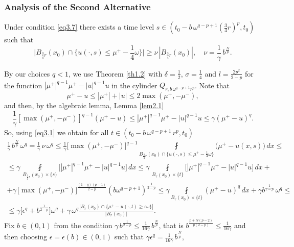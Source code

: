 \documentclass[a4paper,11pt,fullpage]{article}
\numberwithin{equation}{section}
\begin{document}
\subsubsection{Analysis of the Second Alternative}
Under condition \eqref{eq3.7} there exists a time level $s\in (t_0-b\,\omega^{q-p+1}(\frac{3}{4}r)^p, t_0)$ such that
\begin{equation*}
\big|B_{\frac{3}{4} r}(x_0)\cap \big\{u(\cdot, s)\leqslant \mu^+-\frac{1}{4}\omega\big\}\big|\geqslant \nu\,|B_{\frac{3}{4}r}(x_0)|,\quad \nu=\frac{1}{\gamma}\,b^{\frac{N}{p}}.
\end{equation*}

By our choices $q<1$, we use Theorem \ref{th1.2} with  $\delta=\frac{1}{2}$, $\sigma=\frac{1}{4}$ and $l=\frac{2p^2}{2-p}$ for the function $|\mu^+|^{q-1}\mu^+-|u|^{q-1}u$ in the cylinder $Q_{r, b\, \omega^{q-p+1} r^p}$. Note that 
$$\mu^+-u\leqslant |\mu^+|+|u|\leqslant 2 \max(\mu^+, -\mu^-),$$
and then, by the algebraic lemma, Lemma \ref{lem2.1}
$$\frac{1}{\gamma}[\max(\mu^+, -\mu^-)]^{q-1}(\mu^+-u)\leqslant |\mu^+|^{q-1}\mu^+-|u|^{q-1} u\leqslant \gamma (\mu^+-u)^q.$$
So, using \eqref{eq3.1} we obtain for all $t\in (t_0-b\,\omega^{q-p+1}\,r^p, t_0)$ 
\begin{multline}\label{eq3.9}
\frac{1}{\gamma}\,b^{\frac{N}{p}}\,\omega^q=\frac{1}{\gamma}\,\nu\,\omega^q\leqslant \frac{1}{\gamma} \big[\max(\mu^+, -\mu^-)\big]^{q-1}\fint\limits_{B_{\frac{3}{4}r}(x_0)\cap\{u(\cdot, s)\leqslant \mu^+-\frac{1}{4}\omega\}}\big(\mu^+-u(x, s)\big)\,dx\leqslant\\\leqslant 
\gamma\,\fint\limits_{B_{\frac{3}{4} r}(x_0)\times\{s\}}\Big[|\mu^+|^{q-1}\mu^+-|u|^{q-1} u\Big]\,dx\leqslant
\gamma\,\fint\limits_{B_r(x_0)\times\{t\}}\Big[|\mu^+|^{q-1}\mu^+-|u|^{q-1} u\Big]\,dx
+\\+\gamma\,\big[\max(\mu^+, -\mu^-)\big]^{\frac{(1-q)(p-1)}{2-p}}(b\omega^{q-p+1})^{\frac{1}{2-p}}\leqslant
\gamma \fint\limits_{B_r(x_0)\times\{t\}}(\mu^+-u)^q\,dx+\gamma b^{\frac{1}{2-p}}\,\omega^q\leqslant\\\leqslant
\gamma \Big[\epsilon^q+b^{\frac{1}{2-p}}\Big]\omega^q+ \gamma\,\omega^q\frac{|B_r(x_0)\cap\{\mu^+-u(\cdot, t)\geqslant \epsilon \omega\}|}{|B_r(x_0)|}.
\end{multline}
Fix $b\in (0, 1)$ from the condition 
$\gamma\,b^{\frac{1}{2-p}}\leqslant \frac{1}{16\gamma}\,b^{\frac{N}{p}}$, that is $b^{\frac{p+N(p-2)}{p(2-p)}}\leqslant \frac{1}{16\gamma}$
and then choosing $\epsilon=\epsilon(b) \in (0, 1)$ such that $\gamma \epsilon^q=\frac{1}{16 \gamma}\,b^{\frac{N}{p}},$
\end{document}
